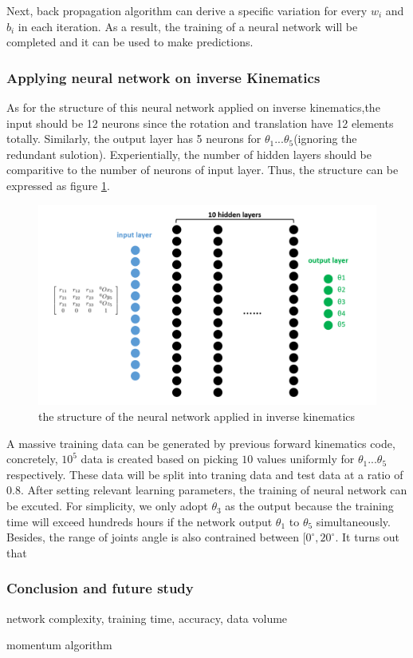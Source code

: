 Next, back propagation algorithm can derive a specific variation for every $w_i$ and $b_i$ in each iteration. As a result, the training of a neural network will be completed and it can be used to make predictions.  

\subsubsection{Applying neural network on inverse Kinematics}
As for the structure of this neural network applied on inverse kinematics,the input should be 12 neurons since the rotation and translation have 12 elements totally. Similarly, the output layer has 5 neurons for $\theta_1...\theta_5$(ignoring the redundant sulotion). Experientially, the number of hidden layers should be comparitive to the number of neurons of input layer. Thus, the structure can be expressed as figure \ref{fig:IK_neural_network}. 

\begin{figure}[htbp] 
\begin{center}
\includegraphics[width=\textwidth]{images/IK_neural_network}
\caption{the structure of the neural network applied in inverse kinematics}
\label{fig:IK_neural_network}
\end{center}
\end{figure}

A massive training data can be generated by previous forward kinematics code, concretely, $10^5$ data is created based on picking $10$ values uniformly for $\theta_1...\theta_5$ respectively. These data will be split into traning data and test data at a ratio of $0.8$.
After setting relevant learning parameters, the training of neural network can be excuted. For simplicity, we only adopt $\theta_3$ as the output because the training time will exceed hundreds hours if the network output $\theta_1$ to $\theta_5$ simultaneously. Besides, the range of joints angle is also contrained between $[0^{\circ},20^{\circ}$. 
It turns out that 





\subsubsection{Conclusion and future study}
network complexity, training time, accuracy, data volume 

momentum algorithm